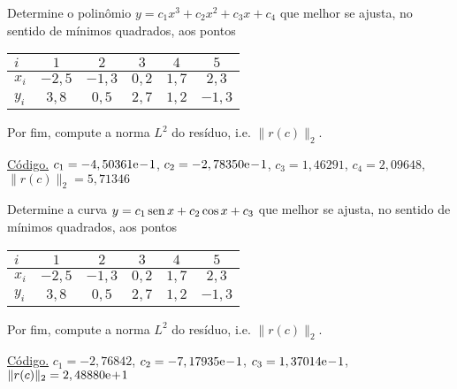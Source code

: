 \begin{exer}\label{exer:mq_poli}
  Determine o polinômio $y = c_1x^3 + c_2x^2 + c_3x + c_4$ que melhor se ajusta, no sentido de mínimos quadrados, aos pontos
  \begin{center}
    \begin{tabular}{l|ccccc}
      $i$ & $1$ & $2$ & $3$ & $4$ & $5$ \\\hline
      $x_i$ & $-2,5$ & $-1,3$ & $0,2$ & $1,7$ & $2,3$\\
      $y_i$ & $3,8$ & $0,5$ & $2,7$ & $1,2$ & $-1,3$\\\hline
    \end{tabular}
  \end{center}
Por fim, compute a norma $L^2$ do resíduo, i.e. $\|r(c)\|_2$.
\end{exer}
\begin{resp}
  \ifisoctave 
  \href{https://github.com/phkonzen/notas/blob/master/src/MatematicaNumerica/cap_ajuste/dados/exer_mq_poli/exer_mq_poli.m}{Código.} 
  \fi
  $c_1 = -4,50361\mathrm{e}\!-\!1$, $c_2 = -2,78350\mathrm{e}\!-\!1$, $c_3 = 1,46291$, $c_4 = 2,09648$, $\|r(c)\|_2 = 5,71346$
\end{resp}

\begin{exer}\label{exer:mq_curva}
  Determine a curva $y = c_1\operatorname{sen} x + c_2\cos x + c_3$ que melhor se ajusta, no sentido de mínimos quadrados, aos pontos
  \begin{center}
    \begin{tabular}{l|ccccc}
      $i$ & $1$ & $2$ & $3$ & $4$ & $5$ \\\hline
      $x_i$ & $-2,5$ & $-1,3$ & $0,2$ & $1,7$ & $2,3$\\
      $y_i$ & $3,8$ & $0,5$ & $2,7$ & $1,2$ & $-1,3$\\\hline
    \end{tabular}
  \end{center}
Por fim, compute a norma $L^2$ do resíduo, i.e. $\|r(c)\|_2$.
\end{exer}
\begin{resp}
  \ifisoctave 
  \href{https://github.com/phkonzen/notas/blob/master/src/MatematicaNumerica/cap_ajuste/dados/exer_mq_curva/exer_mq_curva.m}{Código.} 
  \fi
  $c_1 = -2,76842$, $c_2 = -7,17935\mathrm{e}\!-\!1$, $c_3 = 1,37014\mathrm{e}\!-\!1$, $\|r(c)\|_2 = 2,48880\mathrm{e}\!+\!1$
\end{resp}

